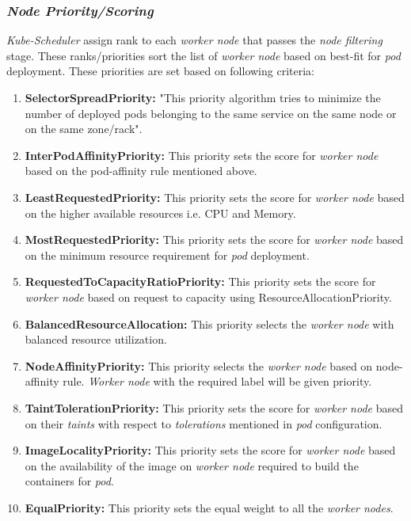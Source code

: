 \subsubsection{\emph{Node Priority/Scoring}}
\label{sec:node-priority}
\emph{Kube-Scheduler} assign rank to each \emph{worker node} that passes the \emph{node filtering} stage. These ranks/priorities sort the list of \emph{worker node} based on best-fit for \emph{pod} deployment. These priorities are set based on following criteria\cite{k8s}:
\begin{enumerate}
  \item \textbf{SelectorSpreadPriority:} "This priority algorithm tries to minimize the number of deployed pods belonging to the same service on the same node or on the same zone/rack"\cite{Santos2019}.
  \item \textbf{InterPodAffinityPriority:} This priority sets the score for \emph{worker node} based on the pod-affinity rule mentioned above.
  \item \textbf{LeastRequestedPriority:} This priority sets the score for \emph{worker node} based on the higher available resources i.e. CPU and Memory.
  \item \textbf{MostRequestedPriority:} This priority sets the score for \emph{worker node} based on the minimum resource requirement for \emph{pod} deployment.
  \item \textbf{RequestedToCapacityRatioPriority:} This priority sets the score for \emph{worker node} based on request to capacity using ResourceAllocationPriority.
  \item \textbf{BalancedResourceAllocation:} This priority selects the \emph{worker node} with balanced resource utilization.
  \item \textbf{NodeAffinityPriority:} This priority selects the \emph{worker node} based on node-affinity rule. \emph{Worker node} with the required label will be given priority.
  \item \textbf{TaintTolerationPriority:} This priority sets the score for \emph{worker node} based on their \emph{taints} with respect to \emph{tolerations} mentioned in \emph{pod} configuration\cite{Santos2019}.
  \item \textbf{ImageLocalityPriority:} This priority sets the score for \emph{worker node} based on the availability of the image on \emph{worker node} required to build the containers for \emph{pod}.
  \item \textbf{EqualPriority:} This priority sets the equal weight to all the \emph{worker nodes}.
\end{enumerate}

